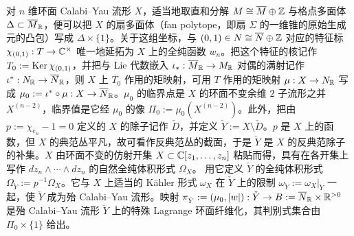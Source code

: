 对 $n$ 维环面 Calabi--Yau 流形 $X$，适当地取直和分解 $M\cong\overline{M}\oplus\mathbb{Z}$ 与格点多面体 $\Delta\subset\overline{M}_{\mathbb{R}}$，便可以把 $X$ 的扇多面体（fan polytope，即扇 $\Sigma$ 的一维锥的原始生成元的凸包）写成 $\Delta\times\{1\}$。关于这组坐标，与 $(0,1)\in N\cong\overline{N}\oplus\mathbb{Z}$ 对应的特征标 $\chi_{(0,1)}:T\to\mathbb{C}^\times$ 唯一地延拓为 $X$ 上的全纯函数 $w_n$。把这个特征的核记作 $T_0:=\operatorname{Ker}\chi_{(0,1)}$，并把与 Lie 代数嵌入 $\iota_*:\overline{M}_{\mathbb{R}}\to M_{\mathbb{R}}$ 对偶的满射记作 $\iota^*:N_{\mathbb{R}}\to\overline{N}_{\mathbb{R}}$，则 $X$ 上 $T_0$ 作用的矩映射，可用 $T$ 作用的矩映射 $\mu:X\to N_{\mathbb{R}}$ 写成 $\mu_0:=\iota^*\circ\mu:X\to\overline{N}_{\mathbb{R}}$。$\mu_0$ 的临界点是 $X$ 的环面不变余维 $2$ 子流形之并 $X^{(n-2)}$，临界值是它经 $\mu_0$ 的像 $\Pi_0:=\mu_0\left(X^{(n-2)}\right)$。此外，把由 $p:=\chi_{e_n}-1=0$ 定义的 $X$ 的除子记作 $\check D$，并定义 $\check Y:=X\setminus\check D$。$p$ 是 $X$ 上的函数，但 $X$ 的典范丛平凡，故可看作反典范丛的截面，于是 $\check Y$ 是 $X$ 的反典范除子的补集。$X$ 由环面不变的仿射开集 $X\subset\mathbb{C}[z_1,\dots,z_n]$ 粘贴而得，具有在各开集上写作 $dz_n\wedge\cdots\wedge dz_n$ 的自然全纯体积形式 $\Omega_X$。
用它定义 $\check Y$ 的全纯体积形式 $\Omega_{\check Y}:=p^{-1}\Omega_X$。它与 $X$ 上适当的 K\"ahler 形式 $\omega_X$ 在 $\check Y$ 上的限制 $\omega_{\check Y}:=\omega_X|_{\check Y}$ 一起，使 $\check Y$ 成为殆 Calabi--Yau 流形。映射 $\pi_{\check Y}:=(\mu_0,|w|):\check Y\to B:=\overline{N}_{\mathbb{R}}\times\mathbb{R}^{>0}$ 是殆 Calabi--Yau 流形 $\check Y$ 上的特殊 Lagrange 环面纤维化，其判别式集合由 $\Pi_0\times\{1\}$ 给出。

